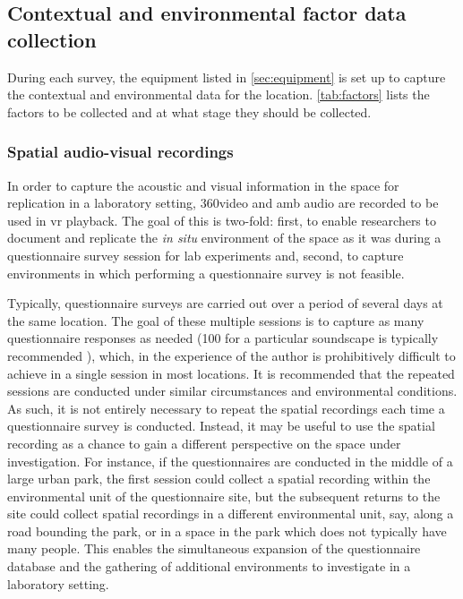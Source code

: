  \subsection{Contextual and environmental factor data collection}

   During each survey, the equipment listed in \cref{sec:equipment} is set up to capture the contextual and environmental data for the location. \cref{tab:factors} lists the factors to be collected and at what stage they should be collected.

   \subsubsection{Spatial audio-visual recordings}

   In order to capture the acoustic and visual information in the space for replication in a laboratory setting, 360\degree video and \gls{amb} audio are recorded to be used in \gls{vr} playback. The goal of this is two-fold: first, to enable researchers to document and replicate the \textit{in situ} environment of the space as it was during a questionnaire survey session for lab experiments and, second, to capture environments in which performing a questionnaire survey is not feasible.

   Typically, questionnaire surveys are carried out over a period of several days at the same location. The goal of these multiple sessions is to capture as many questionnaire responses as needed (100 for a particular soundscape is typically recommended \citep{Engel2018Review}), which, in the experience of the author is prohibitively difficult to achieve in a single session in most locations. It is recommended that the repeated sessions are conducted under similar circumstances and environmental conditions. As such, it is not entirely necessary to repeat the spatial recordings each time a questionnaire survey is conducted. Instead, it may be useful to use the spatial recording as a chance to gain a different perspective on the space under investigation. For instance, if the questionnaires are conducted in the middle of a large urban park, the first session could collect a spatial recording within the environmental unit of the questionnaire site, but the subsequent returns to the site could collect spatial recordings in a different environmental unit, say, along a road bounding the park, or in a space in the park which does not typically have many people. This enables the simultaneous expansion of the questionnaire database and the gathering of additional environments to investigate in a laboratory setting.

